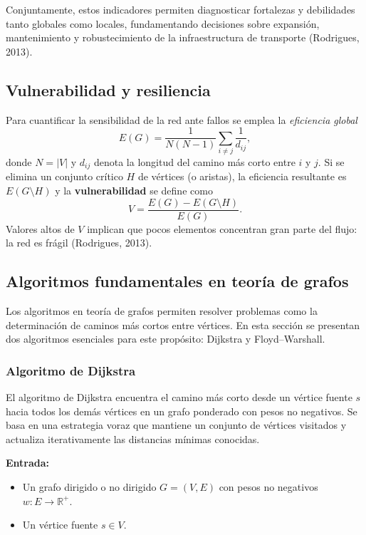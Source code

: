     Conjuntamente, estos indicadores permiten diagnosticar fortalezas y debilidades tanto globales como locales, fundamentando decisiones sobre expansión, mantenimiento y robustecimiento de la infraestructura de transporte (Rodrigues, 2013).


    \subsection{Vulnerabilidad y resiliencia}

    Para cuantificar la sensibilidad de la red ante fallos se emplea la \emph{eficiencia global}
    \begin{equation}
        E(G)=\frac{1}{N(N-1)}\sum_{i\neq j}\frac{1}{d_{ij}},
    \end{equation}
    donde $N=|V|$ y $d_{ij}$ denota la longitud del camino más corto entre $i$ y $j$. Si se elimina un conjunto crítico $H$ de vértices (o aristas), la eficiencia resultante es $E(G\setminus H)$ y la \textbf{vulnerabilidad} se define como
    \begin{equation}
        V=\frac{E(G)-E(G\setminus H)}{E(G)}.
    \end{equation}
    Valores altos de $V$ implican que pocos elementos concentran gran parte del flujo: la red es frágil (Rodrigues, 2013).

    \subsection{Algoritmos fundamentales en teoría de grafos}
        Los algoritmos en teoría de grafos permiten resolver problemas como la determinación de caminos más cortos entre vértices. En esta sección se presentan dos algoritmos esenciales para este propósito: Dijkstra y Floyd–Warshall.

        \subsubsection{Algoritmo de Dijkstra}

        El algoritmo de Dijkstra encuentra el camino más corto desde un vértice fuente $s$ hacia todos los demás vértices en un grafo ponderado con pesos no negativos. Se basa en una estrategia voraz que mantiene un conjunto de vértices visitados y actualiza iterativamente las distancias mínimas conocidas.

        \textbf{Entrada:}
        \begin{itemize}
            \item Un grafo dirigido o no dirigido $G = (V, E)$ con pesos no negativos $w: E \to \mathbb{R}^+$.
            \item Un vértice fuente $s \in V$.
        \end{itemize}

